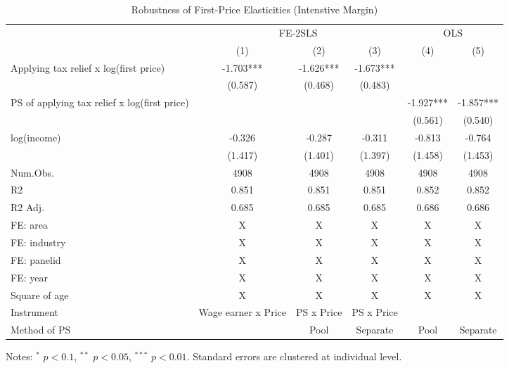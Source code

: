 \documentclass[
  11pt,
  a4paper,
]{article}
\begin{document}
\begin{table}

\caption{\label{tab:rob1intensive}Robustness of First-Price Elasticities (Intenstive Margin)}
\centering
\fontsize{9}{11}\selectfont
\begin{threeparttable}
\begin{tabular}[t]{lccccc}
\toprule
\multicolumn{1}{c}{ } & \multicolumn{3}{c}{FE-2SLS} & \multicolumn{2}{c}{OLS} \\
\cmidrule(l{3pt}r{3pt}){2-4} \cmidrule(l{3pt}r{3pt}){5-6}
  & (1) & (2) & (3) & (4) & (5)\\
\midrule
Applying tax relief x log(first price) & -1.703*** & -1.626*** & -1.673*** &  & \\
 & (0.587) & (0.468) & (0.483) &  & \\
PS of applying tax relief x log(first price) &  &  &  & -1.927*** & -1.857***\\
 &  &  &  & (0.561) & (0.540)\\
log(income) & -0.326 & -0.287 & -0.311 & -0.813 & -0.764\\
 & (1.417) & (1.401) & (1.397) & (1.458) & (1.453)\\
\midrule
Num.Obs. & 4908 & 4908 & 4908 & 4908 & 4908\\
R2 & 0.851 & 0.851 & 0.851 & 0.852 & 0.852\\
R2 Adj. & 0.685 & 0.685 & 0.685 & 0.686 & 0.686\\
FE: area & X & X & X & X & X\\
FE: industry & X & X & X & X & X\\
FE: panelid & X & X & X & X & X\\
FE: year & X & X & X & X & X\\
Square of age & X & X & X & X & X\\
Instrument & Wage earner x Price & PS x Price & PS x Price &  & \\
Method of PS &  & Pool & Separate & Pool & Separate\\
\bottomrule
\end{tabular}
\begin{tablenotes}
\item Notes: $^{*}$ $p < 0.1$, $^{**}$ $p < 0.05$, $^{***}$ $p < 0.01$. Standard errors are clustered at individual level.
\end{tablenotes}
\end{threeparttable}
\end{table}
\end{document}
